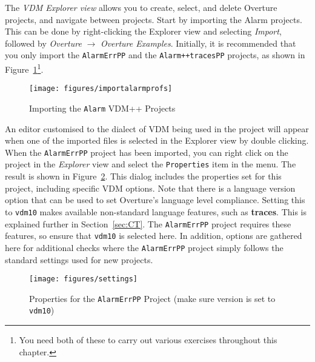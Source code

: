 The \emph{VDM Explorer view} allows you to create, select, and delete Overture projects, and navigate between projects.  Start by importing the Alarm projects.  This can be done by right-clicking the Explorer view and selecting \emph{Import}, followed by \emph{Overture} $\rightarrow$ \emph{Overture Examples}. Initially, it is recommended that you only import the \texttt{AlarmErrPP} and the \texttt{Alarm++tracesPP} projects, as shown in Figure~\ref{fig:importalarm}\footnote{You need both of these to carry out various exercises throughout this chapter.}.
%
\begin{figure}[!htb]
\begin{center}
  \texttt{[image: figures/importalarmprofs]}
  \caption[labelInTOC]{Importing the \texttt{Alarm} VDM++ Projects}
  \label{fig:importalarm}
\end{center}
\end{figure}
%
An editor customised to the dialect of VDM being used in the project will appear when one of the imported files is selected in the Explorer view by double clicking. When the
\texttt{AlarmErrPP} project has been imported, you can right click on the project in the \emph{Explorer} view and select the \texttt{Properties} item in the menu.  The result is shown in Figure~\ref{fig:settings}. This dialog includes the properties set for this project, including specific VDM options. Note that there is a language version option that can be used to set Overture's language level compliance.  Setting this to \texttt{vdm10} makes available non-standard language features, such as {\bf\ttfamily traces}.  This is explained further in Section~\ref{sec:CT}.  The \texttt{AlarmErrPP} project requires these features, so ensure that \texttt{vdm10} is selected here.  In addition, options are gathered here for additional checks where the \texttt{AlarmErrPP} project simply follows the standard settings used for new projects.
%
\begin{figure}[!htb]
\begin{center}
  \texttt{[image: figures/settings]}
  \caption[labelInTOC]{Properties for the \texttt{AlarmErrPP} Project (make sure version is set to \texttt{vdm10})}
  \label{fig:settings}
\end{center}
\end{figure}


